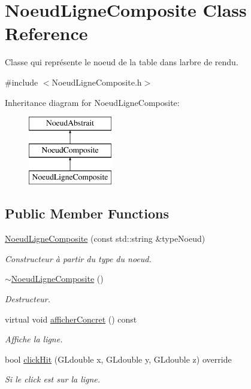 \hypertarget{class_noeud_ligne_composite}{}\section{Noeud\+Ligne\+Composite Class Reference}
\label{class_noeud_ligne_composite}


Classe qui représente le noeud de la table dans l\textquotesingle{}arbre de rendu.  




{\ttfamily \#include $<$Noeud\+Ligne\+Composite.\+h$>$}

Inheritance diagram for Noeud\+Ligne\+Composite\+:\begin{figure}[H]
\begin{center}
\leavevmode
\includegraphics[height=3.000000cm]{class_noeud_ligne_composite}
\end{center}
\end{figure}
\subsection*{Public Member Functions}
{\bf }\par
\begin{DoxyCompactItemize}
\item 
\hyperlink{class_noeud_ligne_composite_af9846268635cbb0331feab18575c2607}{Noeud\+Ligne\+Composite} (const std\+::string \&type\+Noeud)
\begin{DoxyCompactList}\small\item\em Constructeur à partir du type du noeud. \end{DoxyCompactList}\item 
\hyperlink{class_noeud_ligne_composite_a400904537333bb2ae7e462ced349bdd2}{$\sim$\+Noeud\+Ligne\+Composite} ()
\begin{DoxyCompactList}\small\item\em Destructeur. \end{DoxyCompactList}\item 
virtual void \hyperlink{class_noeud_ligne_composite_a24738e9ba75c1b0d69e5a99edcba1682}{afficher\+Concret} () const 
\begin{DoxyCompactList}\small\item\em Affiche la ligne. \end{DoxyCompactList}\item 
bool \hyperlink{class_noeud_ligne_composite_a2b7f3bf28018fc6c6616b539dc342524}{click\+Hit} (G\+Ldouble x, G\+Ldouble y, G\+Ldouble z) override
\begin{DoxyCompactList}\small\item\em Si le click est sur la ligne. \end{DoxyCompactList}\end{DoxyCompactItemize}


